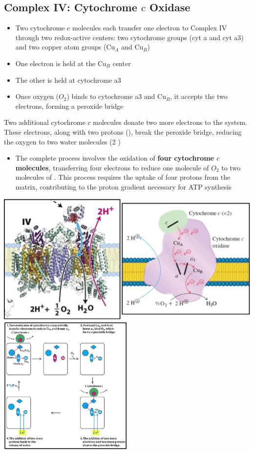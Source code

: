 \documentclass[10pt]{article}
\newcommand{\water}{\text{H$_2$O}}
\newcommand{\proton}{\text{H$^+$}}
\begin{document}
\subsection*{Complex IV: Cytochrome $c$ Oxidase}
\begin{itemize}
	\item Two cytochrome $c$ molecules each transfer one electron to Complex IV through two redox-active centers: two cytochrome groups (cyt a and cyt a3) and two copper atom groups (Cu$_A$ and Cu$_B$)
	\item One electron is held at the Cu$_B$ center
	\item The other is held at cytochrome a3
	\item Once oxygen ($O_2$) binds to cytochrome a3 and Cu$_B$, it accepts the two electrons, forming a peroxide bridge
\end{itemize}
Two additional cytochrome $c$ molecules donate two more electrons to the system.  These electrons, along with two protons (\proton), break the peroxide bridge, reducing the oxygen to two water molecules (2 \water)
\begin{itemize}
	\item The complete process involves the oxidation of \textbf{four cytochrome $c$ molecules}, transferring four electrons to reduce one molecule of $O_2$ to two molecules of \water.  This process requires the uptake of four protons from the matrix, contributing to the proton gradient necessary for ATP synthesis
\end{itemize}
\begin{center} 
	\includegraphics*[width=\textwidth]{L2_17.png} \\
    \includegraphics*[width=0.5\textwidth]{L2_18.png} 
\end{center}
\end{document}

